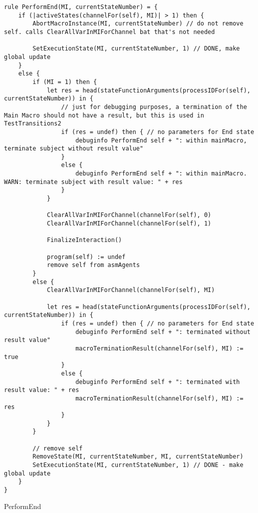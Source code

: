 \begin{listing}[H]
\begin{verbatim}
rule PerformEnd(MI, currentStateNumber) = {
    if (|activeStates(channelFor(self), MI)| > 1) then {
        AbortMacroInstance(MI, currentStateNumber) // do not remove self. calls ClearAllVarInMIForChannel bat that's not needed

        SetExecutionState(MI, currentStateNumber, 1) // DONE, make global update
    }
    else {
        if (MI = 1) then {
            let res = head(stateFunctionArguments(processIDFor(self), currentStateNumber)) in {
                // just for debugging purposes, a termination of the Main Macro should not have a result, but this is used in TestTransitions2
                if (res = undef) then { // no parameters for End state
                    debuginfo PerformEnd self + ": within mainMacro, terminate subject without result value"
                }
                else {
                    debuginfo PerformEnd self + ": within mainMacro. WARN: terminate subject with result value: " + res
                }
            }

            ClearAllVarInMIForChannel(channelFor(self), 0)
            ClearAllVarInMIForChannel(channelFor(self), 1)

            FinalizeInteraction()

            program(self) := undef
            remove self from asmAgents
        }
        else {
            ClearAllVarInMIForChannel(channelFor(self), MI)

            let res = head(stateFunctionArguments(processIDFor(self), currentStateNumber)) in {
                if (res = undef) then { // no parameters for End state
                    debuginfo PerformEnd self + ": terminated without result value"
                    macroTerminationResult(channelFor(self), MI) := true
                }
                else {
                    debuginfo PerformEnd self + ": terminated with result value: " + res
                    macroTerminationResult(channelFor(self), MI) := res
                }
            }
        }

        // remove self
        RemoveState(MI, currentStateNumber, MI, currentStateNumber)
        SetExecutionState(MI, currentStateNumber, 1) // DONE - make global update
    }
}
\end{verbatim}
\caption{PerformEnd}
\label{lst:asm:PerformEnd}
\end{listing}






